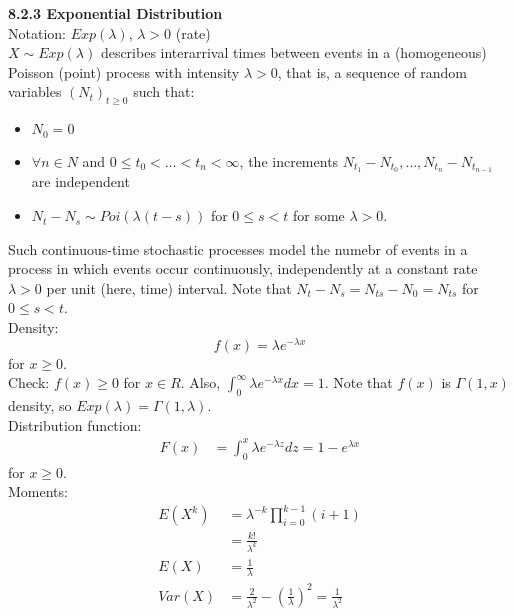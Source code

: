 \documentclass[10pt,letterpaper]{article}
\begin{document}
\pagebreak

\textbf{8.2.3 Exponential Distribution}\\

				Notation: $Exp(\lambda)$, $\lambda>0$ (rate)\\
				
				$X\sim Exp(\lambda)$ describes interarrival times between events in a (homogeneous) Poisson (point) process with intensity $\lambda>0$, that is, a sequence of random variables $(N_t)_{t\geq 0}$ such that:
				\begin{itemize}
					\item $N_0=0$
					\item $\forall n\in N$ and $0\leq t_0<\dots<t_n<\infty$, the increments $N_{t_1}-N_{t_0}, \dots, N_{t_n}-N_{t_{n-1}}$ are independent
					\item $N_t-N_s\sim Poi(\lambda(t-s))$ for $0\leq s<t$ for some $\lambda>0$.
				\end{itemize}
				
				Such continuous-time stochastic processes model the numebr of events in a process in which events occur continuously, independently at a constant rate $\lambda>0$ per unit (here, time) interval. Note that $N_t-N_s=N_{ts}-N_0=N_{ts}$ for $0\leq s<t$.\\
				
				Density: \[f(x)=\lambda e^{-\lambda x}\] for $x\geq0$.\\
				
				Check: $f(x)\geq0$ for $x\in R$. Also, $\int_0^{\infty}\lambda e^{-\lambda x}dx=1$. Note that $f(x)$ is $\Gamma(1, x)$ density, so $Exp(\lambda)=\Gamma(1, \lambda)$.\\
				
				Distribution function:
						\begin{align*}
							F(x)&=\int_0^x\lambda e^{-\lambda z}dz=1-e^{\lambda x}
						\end{align*}
						for $x\geq0$.\\
						
				Moments:
						\begin{align*}
							E(X^k)&=\lambda^{-k}\prod_{i=0}^{k-1}(i+1)\\
							&=\frac{k!}{\lambda^k}\\
							E(X)&=\frac{1}{\lambda}\\
							Var(X)&=\frac{2}{\lambda^2}-(\frac{1}{\lambda})^2=\frac{1}{\lambda^2}
						\end{align*}

\pagebreak
\end{document}
